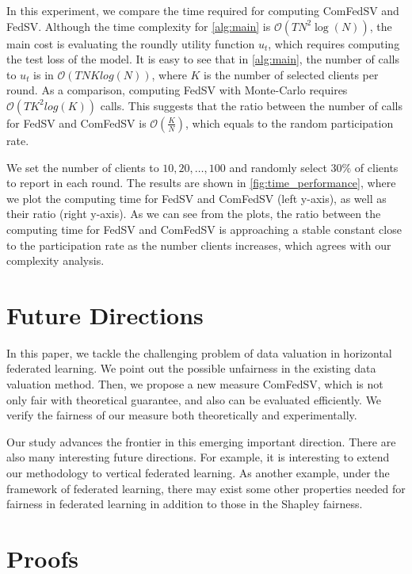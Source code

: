In this experiment, we compare the time required for computing ComFedSV and FedSV. Although the time complexity for \autoref{alg:main} is $\mathcal{O}(TN^2\log(N))$, the main cost is evaluating the roundly utility function $u_t$, which requires computing the test loss of the model. It is easy to see that in \autoref{alg:main}, the number of calls to $u_t$ is in $\mathcal{O}(TNKlog(N))$, where $K$ is the number of selected clients per round. As a comparison, computing FedSV with Monte-Carlo requires $\mathcal{O}(TK^2log(K))$ calls. This suggests that the ratio between the number of calls for FedSV and ComFedSV is $\mathcal{O}(\frac{K}{N})$, which equals to the random participation rate.

We set the number of clients to $10, 20, \dots, 100$ and randomly select $30\%$ of clients to report in each round. The results are shown in \autoref{fig:time_performance}, where we plot the computing time for FedSV and ComFedSV (left y-axis), as well as their ratio (right y-axis). As we can see from the plots, the ratio between the computing time for FedSV and ComFedSV is approaching a stable constant close to the participation rate as the number clients increases, which agrees with our complexity analysis.

\section{Future Directions}
In this paper, we tackle the challenging problem of data valuation in horizontal federated learning. We point out the possible unfairness in the existing data valuation method. Then, we propose a new measure ComFedSV, which is not only fair with theoretical guarantee, and also can be evaluated efficiently. We verify the fairness of our measure both theoretically and experimentally. 

Our study advances the frontier in this emerging important direction. There are also many interesting future directions.  For example, it is interesting to extend our methodology to vertical federated learning. As another example, under the framework of federated learning, there may exist some other properties needed for fairness in federated learning in addition to those in the Shapley fairness.

\section{Proofs}


